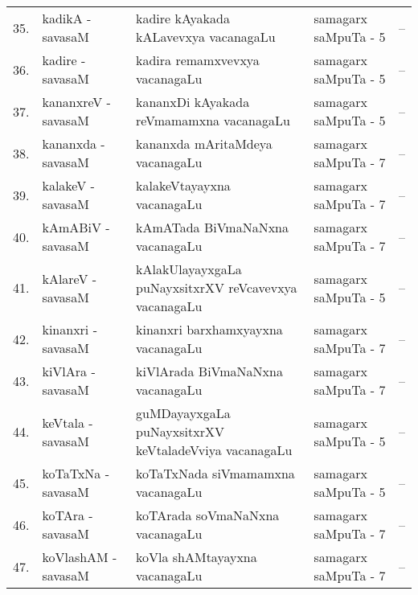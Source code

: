 {\renewcommand{\arraystretch}{1.35}
\begin{longtable}[l]{@{\qquad~}rl>{\raggedright}p{5.5cm}lc}
\endfirsthead
\endhead
\endfoot
\endlastfoot
35. &  kadikA - savasaM &  kadire kAyakada kALavevxya vacanagaLu & samagarx saMpuTa - 5 & --\\
36. &  kadire - savasaM &  kadira remamxvevxya vacanagaLu & samagarx saMpuTa - 5 & --\\
37. &  kananxreV - savasaM & kananxDi kAyakada reVmamamxna vacanagaLu & samagarx saMpuTa - 5 & --\\
38. &  kananxda - savasaM & kananxda mAritaMdeya vacanagaLu & samagarx saMpuTa - 7 & --\\
39. &  kalakeV - savasaM & kalakeVtayayxna vacanagaLu & samagarx saMpuTa - 7 & --\\
40. &  kAmABiV - savasaM & kAmATada BiVmaNaNxna vacanagaLu & samagarx saMpuTa - 7 & --\\
41. &  kAlareV - savasaM & kAlakUlayayxgaLa puNayxsitxrXV reVcavevxya\newline \phantom{AA} vacanagaLu & samagarx saMpuTa - 5 & --\\
42. &  kinanxri - savasaM & kinanxri barxhamxyayxna vacanagaLu & samagarx saMpuTa - 7 & --\\
43. &  kiVlAra - savasaM & kiVlArada BiVmaNaNxna vacanagaLu & samagarx saMpuTa - 7 & --\\
44. &  keVtala - savasaM & guMDayayxgaLa puNayxsitxrXV keVtaladeVviya\newline \phantom{AA} vacanagaLu & samagarx saMpuTa - 5 & --\\
45. &  koTaTxNa - savasaM & koTaTxNada siVmamamxna vacanagaLu & samagarx saMpuTa - 5 & --\\
46. &  koTAra - savasaM & koTArada soVmaNaNxna vacanagaLu & samagarx saMpuTa - 7 & --\\
47. &  koVlashAM - savasaM & koVla shAMtayayxna vacanagaLu & samagarx saMpuTa - 7 & --\\
\end{longtable}}
\medskip

